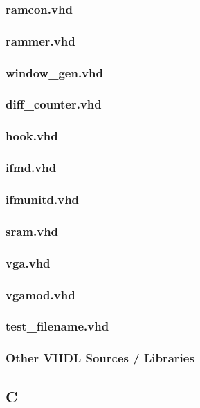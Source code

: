 \documentclass{article}
\begin{document}
\subsubsection{ramcon.vhd}							%
\subsubsection{rammer.vhd}							%
\subsubsection{window\_gen.vhd}					%
\subsubsection{diff\_counter.vhd}					%
\subsubsection{hook.vhd}							%
\subsubsection{ifmd.vhd}							%
\subsubsection{ifmunitd.vhd}						%
\subsubsection{sram.vhd}							%
\subsubsection{vga.vhd}							%
\subsubsection{vgamod.vhd}							%
\subsubsection{test\_filename.vhd}					%
\subsubsection{Other VHDL Sources / Libraries}

\subsection{C}
\end{document}
